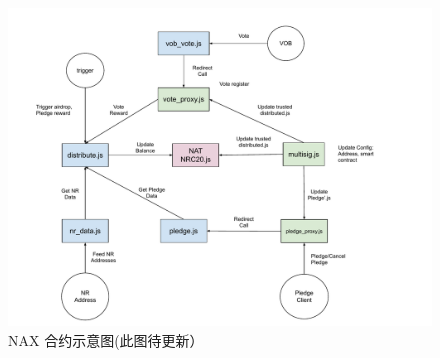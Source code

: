 \begin{figure}[htbp]
    \centering
    \includegraphics[width=1\textwidth]{../common/ch/nax.pdf}
    \caption{NAX 合约示意图(此图待更新） \label{fig:nax_framework}}
\end{figure}
